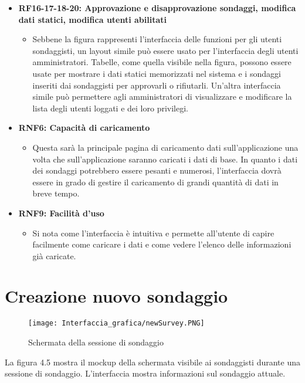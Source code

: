 \begin{itemize}
        \item \textbf{RF16-17-18-20: Approvazione e disapprovazione sondaggi, modifica dati statici, modifica utenti abilitati} \begin{itemize}
            \item Sebbene la figura rappresenti l'interfaccia delle funzioni per gli utenti sondaggisti, un layout simile può essere usato per l'interfaccia degli utenti amministratori. Tabelle, come quella visibile nella figura, possono essere usate per mostrare i dati statici memorizzati nel sistema e i sondaggi inseriti dai sondaggisti per approvarli o rifiutarli. Un'altra interfaccia simile può permettere agli amministratori di visualizzare e modificare la lista degli utenti loggati e dei loro privilegi.
        \end{itemize} 
        \item \textbf{RNF6: Capacità di caricamento} \begin{itemize}
            \item Questa sarà la principale pagina di caricamento dati sull'applicazione una volta che sull'applicazione saranno caricati i dati di base. In quanto i dati dei sondaggi potrebbero essere pesanti e numerosi, l'interfaccia dovrà essere in grado di gestire il caricamento di grandi quantità di dati in breve tempo.
        \end{itemize}
        \item \textbf{RNF9: Facilità d’uso} \begin{itemize}
            \item Si nota come l'interfaccia è intuitiva e permette all'utente di capire facilmente come caricare i dati e come vedere l'elenco delle informazioni già caricate.
        \end{itemize}
    \end{itemize}




\section{Creazione nuovo sondaggio}

    \begin{figure}[H]
        \center
        \texttt{[image: Interfaccia\_grafica/newSurvey.PNG]}
        \caption{Schermata della sessione di sondaggio}
    \end{figure}

    La figura 4.5 mostra il mockup della schermata visibile ai sondaggisti durante una sessione di sondaggio. L'interfaccia mostra informazioni sul sondaggio attuale.

